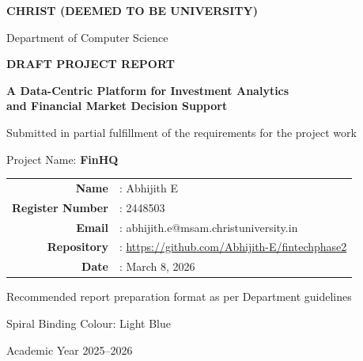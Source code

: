 \documentclass[12pt,a4paper]{report}
\makeatletter
\newcommand{\projecttitle}{A Data-Centric Platform for Investment Analytics\\and Financial Market Decision Support}
\newcommand{\projectshort}{FinHQ}
\newcommand{\studentname}{Abhijith E}
\newcommand{\regno}{2448503}
\newcommand{\studentmail}{abhijith.e@msam.christuniversity.in}
\newcommand{\reportdate}{March 8, 2026}
\newcommand{\repolink}{https://github.com/Abhijith-E/fintechphase2}
\makeatother
\begin{document}
\begin{titlepage}
\thispagestyle{empty}
\centering
\vspace*{0.6in}
{\fontsize{16}{18}\selectfont\bfseries CHRIST (DEEMED TO BE UNIVERSITY)\par}
\vspace{0.1in}
{\fontsize{12}{14}\selectfont Department of Computer Science\par}
\vspace{0.45in}
{\fontsize{16}{18}\selectfont\bfseries DRAFT PROJECT REPORT\par}
\vspace{0.3in}
{\fontsize{16}{18}\selectfont\bfseries \projecttitle\par}
\vspace{0.35in}
{\fontsize{12}{14}\selectfont Submitted in partial fulfillment of the requirements for the project work\par}
\vspace{0.25in}
{\fontsize{12}{14}\selectfont Project Name: \textbf{\projectshort}\par}
\vspace{0.25in}
\begin{tabular}{rl}
\textbf{Name} & : \studentname \\
\textbf{Register Number} & : \regno \\
\textbf{Email} & : \studentmail \\
\textbf{Repository} & : \url{\repolink} \\
\textbf{Date} & : \reportdate \\
\end{tabular}
\vfill
{\fontsize{12}{14}\selectfont Recommended report preparation format as per Department guidelines\par}
\vspace{0.15in}
{\fontsize{12}{14}\selectfont Spiral Binding Colour: Light Blue\par}
\vspace{0.35in}
{\fontsize{12}{14}\selectfont Academic Year 2025--2026\par}
\end{titlepage}
\end{document}

